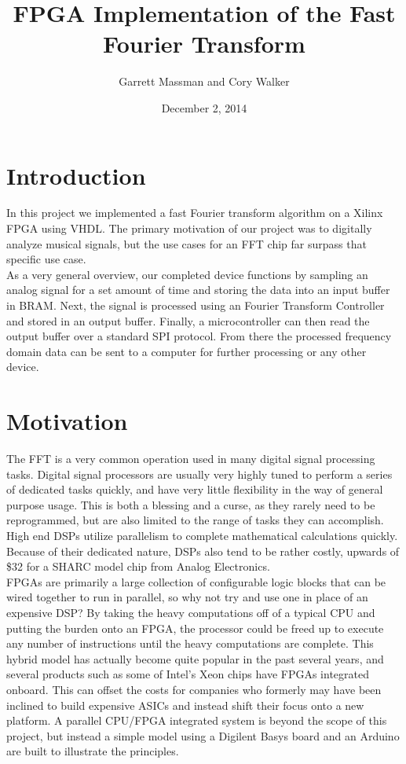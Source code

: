 \documentclass[12pt]{article}
\title{\textbf{FPGA Implementation of the Fast Fourier Transform}}
\date{December 2, 2014}
\author{Garrett Massman and Cory Walker}
\begin{document}
  \maketitle
  \clearpage

  \section*{Introduction}
    In this project we implemented a fast Fourier transform algorithm on a Xilinx FPGA using VHDL. The primary motivation of our project was to digitally analyze musical signals, but the use cases for an FFT chip far surpass that specific use case. \\
    
    As a very general overview, our completed device functions by sampling an analog signal for a set amount of time and storing the data into an input buffer in BRAM. Next, the signal is processed using an Fourier Transform Controller and stored in an output buffer. Finally, a microcontroller can then read the output buffer over a standard SPI protocol. From there the processed frequency domain data can be sent to a computer for further processing or any other device.

  \section*{Motivation}
    The FFT is a very common operation used in many digital signal processing tasks.
    Digital signal processors are usually very highly tuned to perform a series of dedicated tasks quickly, and have very little flexibility in the way of general purpose usage.
    This is both a blessing and a curse, as they rarely need to be reprogrammed, but are also limited to the range of tasks they can accomplish.
    High end DSPs utilize parallelism to complete mathematical calculations quickly.
    Because of their dedicated nature, DSPs also tend to be rather costly, upwards of \$32 for a SHARC model chip from Analog Electronics.\\

    FPGAs are primarily a large collection of configurable logic blocks that can be wired together to run in parallel, so why not try and use one in place of an expensive DSP?
    By taking the heavy computations off of a typical CPU and putting the burden onto an FPGA, the processor could be freed up to execute any number of instructions until the heavy computations are complete.
    This hybrid model has actually become quite popular in the past several years, and several products such as some of Intel's Xeon chips have FPGAs integrated onboard.
    This can offset the costs for companies who formerly may have been inclined to build expensive ASICs and instead shift their focus onto a new platform.
    A parallel CPU/FPGA integrated system is beyond the scope of this project, but instead a simple model using a Digilent Basys board and an Arduino are built to illustrate the principles.
\end{document}
